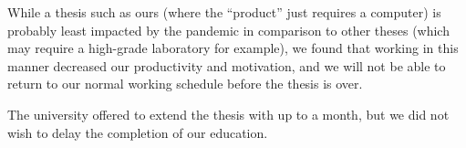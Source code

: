 While a thesis such as ours (where the ``product'' just requires a computer) is probably least impacted by the pandemic in comparison to other theses (which may require a high-grade laboratory for example), we found that working in this manner decreased our productivity and motivation, and we will not be able to return to our normal working schedule before the thesis is over.

The university offered to extend the thesis with up to a month, but we did not wish to delay the completion of our education.

